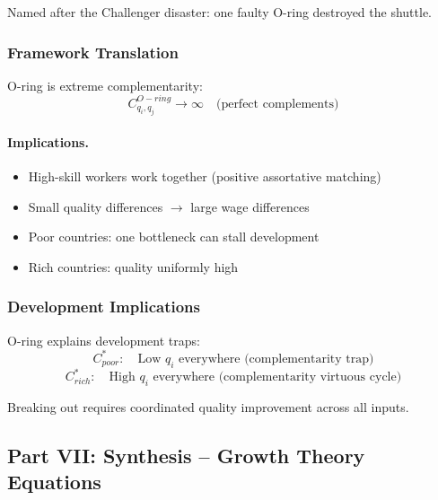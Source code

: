 Named after the Challenger disaster: one faulty O-ring destroyed the shuttle.

\subsubsection{Framework Translation}

O-ring is extreme complementarity:
\begin{equation}
C_{q_i, q_j}^{O-ring} \to \infty \quad \text{(perfect complements)}
\end{equation}

\paragraph{Implications.}
\begin{itemize}
    \item High-skill workers work together (positive assortative matching)
    \item Small quality differences $\to$ large wage differences
    \item Poor countries: one bottleneck can stall development
    \item Rich countries: quality uniformly high
\end{itemize}

\subsubsection{Development Implications}

O-ring explains development traps:
\begin{equation}
C^*_{poor}: \quad \text{Low } q_i \text{ everywhere (complementarity trap)}
\end{equation}
\begin{equation}
C^*_{rich}: \quad \text{High } q_i \text{ everywhere (complementarity virtuous cycle)}
\end{equation}

Breaking out requires coordinated quality improvement across all inputs.

\subsection{Part VII: Synthesis – Growth Theory Equations}


